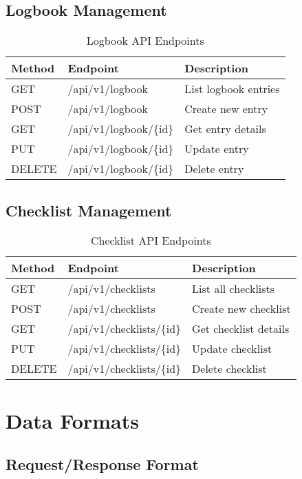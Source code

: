 \subsection{Logbook Management}

\begin{table}[H]
\centering
\begin{tabular}{@{}llp{6cm}@{}}
\toprule
\textbf{Method} & \textbf{Endpoint} & \textbf{Description} \\
\midrule
GET & /api/v1/logbook & List logbook entries \\
POST & /api/v1/logbook & Create new entry \\
GET & /api/v1/logbook/\{id\} & Get entry details \\
PUT & /api/v1/logbook/\{id\} & Update entry \\
DELETE & /api/v1/logbook/\{id\} & Delete entry \\
\bottomrule
\end{tabular}
\caption{Logbook API Endpoints}
\label{tab:logbook_api}
\end{table}

\subsection{Checklist Management}

\begin{table}[H]
\centering
\begin{tabular}{@{}llp{6cm}@{}}
\toprule
\textbf{Method} & \textbf{Endpoint} & \textbf{Description} \\
\midrule
GET & /api/v1/checklists & List all checklists \\
POST & /api/v1/checklists & Create new checklist \\
GET & /api/v1/checklists/\{id\} & Get checklist details \\
PUT & /api/v1/checklists/\{id\} & Update checklist \\
DELETE & /api/v1/checklists/\{id\} & Delete checklist \\
\bottomrule
\end{tabular}
\caption{Checklist API Endpoints}
\label{tab:checklist_api}
\end{table}

\section{Data Formats}

\subsection{Request/Response Format}

